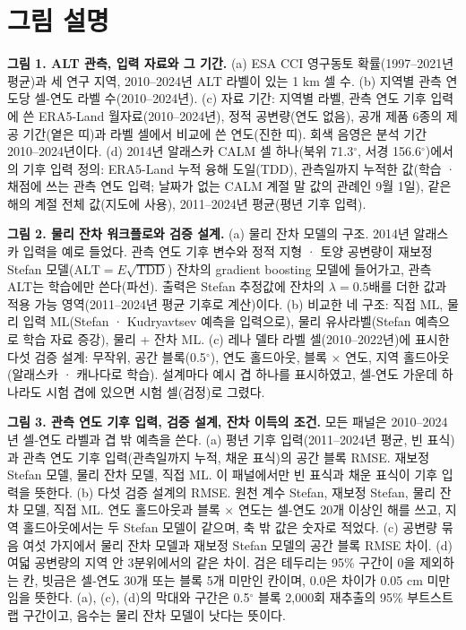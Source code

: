 \section*{그림 설명}

\textbf{그림 1. ALT 관측, 입력 자료와 그 기간.} (a) ESA CCI 영구동토 확률(1997--2021년 평균)과 세 연구 지역, 2010--2024년 ALT 라벨이 있는 1 km 셀 수. (b) 지역별 관측 연도당 셀-연도 라벨 수(2010--2024년). (c) 자료 기간: 지역별 라벨, 관측 연도 기후 입력에 쓴 ERA5-Land 월자료(2010--2024년), 정적 공변량(연도 없음), 공개 제품 6종의 제공 기간(옅은 띠)과 라벨 셀에서 비교에 쓴 연도(진한 띠). 회색 음영은 분석 기간 2010--2024년이다. (d) 2014년 알래스카 CALM 셀 하나(북위 71.3$^\circ$, 서경 156.6$^\circ$)에서의 기후 입력 정의: ERA5-Land 누적 융해 도일(TDD), 관측일까지 누적한 값(학습 · 채점에 쓰는 관측 연도 입력; 날짜가 없는 CALM 계절 말 값의 관례인 9월 1일), 같은 해의 계절 전체 값(지도에 사용), 2011--2024년 평균(평년 기후 입력).

\textbf{그림 2. 물리 잔차 워크플로와 검증 설계.} (a) 물리 잔차 모델의 구조. 2014년 알래스카 입력을 예로 들었다. 관측 연도 기후 변수와 정적 지형 · 토양 공변량이 재보정 Stefan 모델($\mathrm{ALT}=E\sqrt{\mathrm{TDD}}$) 잔차의 gradient boosting 모델에 들어가고, 관측 ALT는 학습에만 쓴다(파선). 출력은 Stefan 추정값에 잔차의 $\lambda=0.5$배를 더한 값과 적용 가능 영역(2011--2024년 평균 기후로 계산)이다. (b) 비교한 네 구조: 직접 ML, 물리 입력 ML(Stefan · Kudryavtsev 예측을 입력으로), 물리 유사라벨(Stefan 예측으로 학습 자료 증강), 물리 + 잔차 ML. (c) 레나 델타 라벨 셀(2010--2022년)에 표시한 다섯 검증 설계: 무작위, 공간 블록(0.5$^\circ$), 연도 홀드아웃, 블록 × 연도, 지역 홀드아웃(알래스카 · 캐나다로 학습). 설계마다 예시 겹 하나를 표시하였고, 셀-연도 가운데 하나라도 시험 겹에 있으면 시험 셀(검정)로 그렸다.

\textbf{그림 3. 관측 연도 기후 입력, 검증 설계, 잔차 이득의 조건.} 모든 패널은 2010--2024년 셀-연도 라벨과 겹 밖 예측을 쓴다. (a) 평년 기후 입력(2011--2024년 평균, 빈 표식)과 관측 연도 기후 입력(관측일까지 누적, 채운 표식)의 공간 블록 RMSE. 재보정 Stefan 모델, 물리 잔차 모델, 직접 ML. 이 패널에서만 빈 표식과 채운 표식이 기후 입력을 뜻한다. (b) 다섯 검증 설계의 RMSE. 원천 계수 Stefan, 재보정 Stefan, 물리 잔차 모델, 직접 ML. 연도 홀드아웃과 블록 × 연도는 셀-연도 20개 이상인 해를 쓰고, 지역 홀드아웃에서는 두 Stefan 모델이 같으며, 축 밖 값은 숫자로 적었다. (c) 공변량 묶음 여섯 가지에서 물리 잔차 모델과 재보정 Stefan 모델의 공간 블록 RMSE 차이. (d) 여덟 공변량의 지역 안 3분위에서의 같은 차이. 검은 테두리는 95\% 구간이 0을 제외하는 칸, 빗금은 셀-연도 30개 또는 블록 5개 미만인 칸이며, 0.0은 차이가 0.05 cm 미만임을 뜻한다. (a), (c), (d)의 막대와 구간은 0.5$^\circ$ 블록 2,000회 재추출의 95\% 부트스트랩 구간이고, 음수는 물리 잔차 모델이 낫다는 뜻이다.

